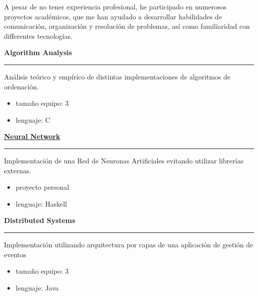 \documentclass [10pt, a4paper] {extarticle}
\newcommand{\rightcolumwidth}{ 0.82 }
\begin{document}
    \begin {flushright}
    \begin {minipage} [t] {\rightcolumwidth\textwidth}
        A pesar de no tener experiencia profesional, he participado en numerosos proyectos académicos, que me han ayudado a desarrollar habilidades de comunicación, organización y resolución de problemas, así como familiaridad con differentes tecnologías. \\ [7px]
        \begin {minipage} [t] {0.3\textwidth}
            \textbf {Algorithm Analysis} \\ [-5px]
            \hrule
            \vspace {4px} Análisis teórico y empírico de distintas implementaciones de algoritmos de ordenación.
            \vspace {-5px}
            \begin {itemize} [noitemsep]
            \item tamaño equipo: 3
            \item lenguaje: C
            \end {itemize}
        \end {minipage}
        \hfill
        \begin {minipage} [t] {0.3\textwidth}
            \href {https://github.com/yref-boop/ann} {\textbf {Neural Network}} \\ [-5px]
            \hrule
            \vspace {4px} Implementación de una Red de Neuronas Artificiales evitando utilizar librerías externas.
            \vspace {-5px}
            \begin {itemize} [noitemsep]
                \item proyecto personal
                \item lenguaje: Haskell
            \end {itemize}
        \end {minipage}
        \hfill
        \begin {minipage} [t] {0.3\textwidth}
            \textbf {Distributed Systems} \\ [-5px]
            \hrule
            \vspace {4px} Implementación utilizando arquitectura por capas de una aplicación de gestión de eventos
            \vspace {-5px}
            \begin {itemize} [noitemsep]
                \item tamaño equipo: 3
                \item lenguaje: Java
            \end {itemize}
        \end {minipage}
    \end {minipage}
    \end {flushright}
\end{document}

